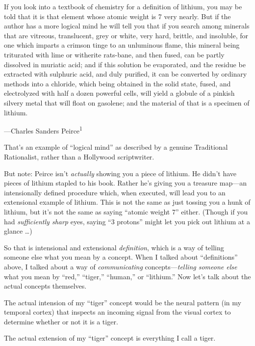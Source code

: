 {
 If you look into a textbook of chemistry for a definition of
lithium, you may be told that it is that element whose atomic weight is
7 very nearly. But if the author has a more logical mind he will tell
you that if you search among minerals that are vitreous, translucent,
grey or white, very hard, brittle, and insoluble, for one which imparts
a crimson tinge to an unluminous flame, this mineral being triturated
with lime or witherite rats-bane, and then fused, can be partly
dissolved in muriatic acid; and if this solution be evaporated, and the
residue be extracted with sulphuric acid, and duly purified, it can be
converted by ordinary methods into a chloride, which being obtained in
the solid state, fused, and electrolyzed with half a dozen powerful
cells, will yield a globule of a pinkish silvery metal that will float
on gasolene; and the material of that is a specimen of lithium.}

{\raggedleft
 {}---Charles Sanders Peirce\textsuperscript{1}
\par}


\bigskip

{
 That's an example of ``logical
mind'' as described by a genuine Traditional
Rationalist, rather than a Hollywood scriptwriter.}

{
 But note: Peirce isn't \textit{actually} showing
you a piece of lithium. He didn't have pieces of
lithium stapled to his book. Rather he's giving you a
treasure map---an intensionally defined procedure which, when executed,
will lead you to an extensional example of lithium. This is not the
same as just tossing you a hunk of lithium, but it's
not the same as saying ``atomic weight
7'' either. (Though if you had \textit{sufficiently
sharp} eyes, saying ``3 protons''
might let you pick out lithium at a glance \ldots)}

{
 So that is intensional and extensional \textit{definition}, which
is a way of telling someone else what you mean by a concept. When I
talked about ``definitions'' above,
I talked about a way of \textit{communicating}
concepts---\textit{telling someone else} what you mean by
``red,''
``tiger,''
``human,'' or
``lithium.'' Now
let's talk about the actual concepts themselves.}

{
 The actual intension of my
``tiger'' concept would be the
neural pattern (in my temporal cortex) that inspects an incoming signal
from the visual cortex to determine whether or not it is a tiger.}

{
 The actual extension of my
``tiger'' concept is everything I
call a tiger.}

